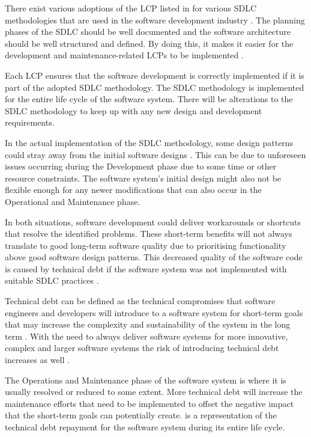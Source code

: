 There exist various adoptions of the LCP listed in  for various SDLC methodologies that are used in the software development industry \cite{Al-Saiyd2015, Jain2018}. The planning phases of the SDLC should be well documented and the software architecture should be well structured and defined. By doing this, it makes it easier for the development and maintenance-related LCPs to be implemented \cite{Ackermann2009}.\par Each LCP ensures that the software development is correctly implemented if it is part of the adopted SDLC methodology. The SDLC methodology is implemented for the entire life cycle of the software system. There will be alterations to the SDLC methodology to keep up with any new design and development requirements.\par In the actual implementation of the SDLC methodology, some design patterns could stray away from the initial software designs \cite{Reimanis2016}. This can be due to unforeseen issues occurring during the Development phase due to some time or other resource constraints. The software system's initial design might also not be flexible enough for any newer modifications that can also occur in the Operational and Maintenance phase. \par In both situations, software development could deliver workarounds or shortcuts that resolve the identified problems. These short-term benefits will not always translate to good long-term software quality due to prioritising functionality above good software design patterns. This decreased quality of the software code is caused by technical debt if the software system was not implemented with suitable SDLC practices \cite{DeLeon-Sigg2020, Reimanis2016}.\par Technical debt can be defined as the technical compromises that software engineers and developers will introduce to a software system for short-term goals that may increase the complexity and sustainability of the system in the long term \cite{Snipes2018, Gralha2018}. With the need to always deliver software systems for more innovative, complex and larger software systems the risk of introducing technical debt increases as well \cite{Reimanis2016, Khan2013}. \par The Operations and Maintenance phase of the software system is where it is usually resolved or reduced to some extent. More technical debt will increase the maintenance efforts that need to be implemented to offset the negative impact that the short-term goals can potentially create.  is a representation of the technical debt repayment for the software system during its entire life cycle.

